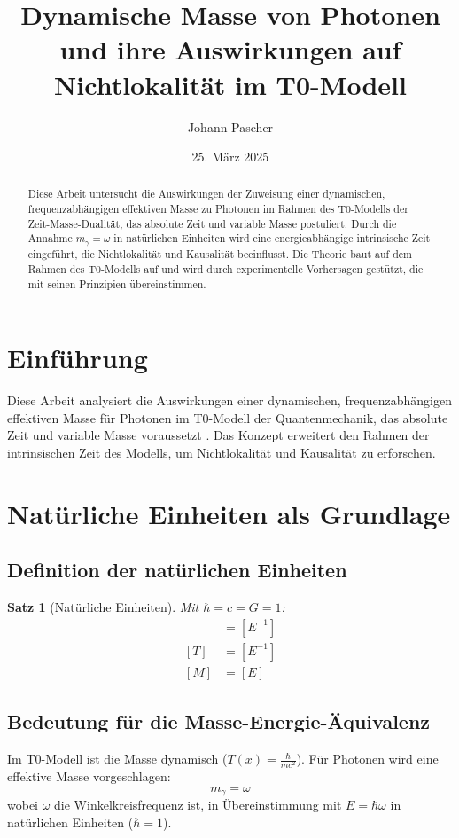 \documentclass[12pt,a4paper]{article}
\title{Dynamische Masse von Photonen und ihre Auswirkungen auf Nichtlokalität im T0-Modell}
\author{Johann Pascher}
\date{25. März 2025}
\newcommand{\Tfield}{T(x)}
\newtheorem{theorem}{Satz}[section]
\begin{document}
	
	\maketitle
	
	\begin{abstract}
		Diese Arbeit untersucht die Auswirkungen der Zuweisung einer dynamischen, frequenzabhängigen effektiven Masse zu Photonen im Rahmen des T0-Modells der Zeit-Masse-Dualität, das absolute Zeit und variable Masse postuliert. Durch die Annahme \(m_\gamma = \omega\) in natürlichen Einheiten wird eine energieabhängige intrinsische Zeit eingeführt, die Nichtlokalität und Kausalität beeinflusst. Die Theorie baut auf dem Rahmen des T0-Modells auf und wird durch experimentelle Vorhersagen gestützt, die mit seinen Prinzipien übereinstimmen.
	\end{abstract}
	
	\tableofcontents
	\newpage
	
	\section{Einführung}
	Diese Arbeit analysiert die Auswirkungen einer dynamischen, frequenzabhängigen effektiven Masse für Photonen im T0-Modell der Quantenmechanik, das absolute Zeit und variable Masse voraussetzt \cite{pascher_galaxies_2025}. Das Konzept erweitert den Rahmen der intrinsischen Zeit des Modells, um Nichtlokalität und Kausalität zu erforschen.
	
	\section{Natürliche Einheiten als Grundlage}
	\subsection{Definition der natürlichen Einheiten}
	\begin{theorem}[Natürliche Einheiten]
		Mit \(\hbar = c = G = 1\):
		\begin{align}
			[L] &= [E^{-1}] \\
			[T] &= [E^{-1}] \\
			[M] &= [E]
		\end{align}
	\end{theorem}
	
	\subsection{Bedeutung für die Masse-Energie-Äquivalenz}
	Im T0-Modell ist die Masse dynamisch (\(\Tfield = \frac{\hbar}{m c^2}\)). Für Photonen wird eine effektive Masse vorgeschlagen:
	\begin{equation}
		m_\gamma = \omega
	\end{equation}
	wobei \(\omega\) die Winkelkreisfrequenz ist, in Übereinstimmung mit \(E = \hbar \omega\) in natürlichen Einheiten (\(\hbar = 1\)).
	
\end{document}
